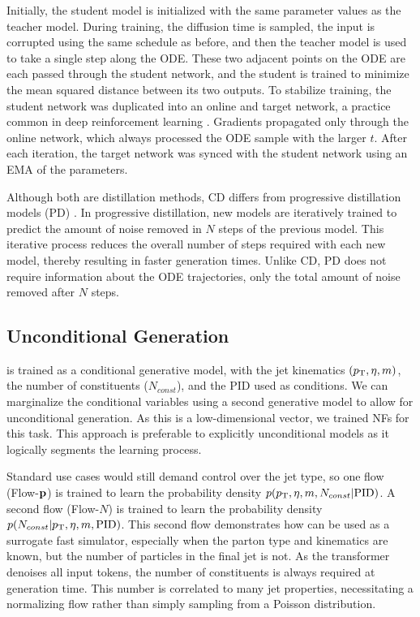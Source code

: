 Initially, the student model is initialized with the same parameter values as the teacher model.
During training, the diffusion time is sampled, the input is corrupted using the same schedule as before, and then the teacher model is used to take a single step along the ODE.
These two adjacent points on the ODE are each passed through the student network, and the student is trained to minimize the mean squared distance between its two outputs.
To stabilize training, the student network was duplicated into an online and target network, a practice common in deep reinforcement learning \cite{PlayingAtariDeep, ContinuousControlDeep, ImplicitQuantileNetworks}.
Gradients propagated only through the online network, which always processed the ODE sample with the larger $t$.
After each iteration, the target network was synced with the student network using an EMA of the parameters.

Although both are distillation methods, CD differs from progressive distillation models (PD) \cite{ProgressiveDistillationFast}.
In progressive distillation, new models are iteratively trained to predict the amount of noise removed in $N$ steps of the previous model.
This iterative process reduces the overall number of steps required with each new model, thereby resulting in faster generation times.
Unlike CD, PD does not require information about the ODE trajectories, only the total amount of noise removed after $N$ steps.

\subsection{Unconditional Generation}

\pcdroid is trained as a conditional generative model, with the jet kinematics $(p_\mathrm{T}, \eta, m)$, the number of constituents ($N_{const}$), and the PID used as conditions.
We can marginalize the conditional variables using a second generative model to allow for unconditional generation.
As this is a low-dimensional vector, we trained NFs for this task.
This approach is preferable to explicitly unconditional models as it logically segments the learning process.

Standard use cases would still demand control over the jet type, so
one flow (Flow-$\mathbf{p}$) is trained to learn the probability density $p(p_\mathrm{T}, \eta, m, N_{const} |\textrm{PID})$.
A second flow (Flow-$N$) is trained to learn the probability density $ p(N_{const}|p_\mathrm{T}, \eta, m, \textrm{PID}) $.
This second flow demonstrates how \pcdroid can be used as a surrogate fast simulator, especially when the parton type and kinematics are known, but the number of particles in the final jet is not.
As the transformer denoises all input tokens, the number of constituents is always required at generation time.
This number is correlated to many jet properties, necessitating a normalizing flow rather than simply sampling from a Poisson distribution.


